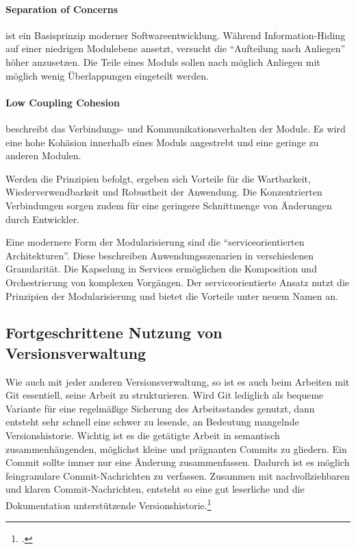 \paragraph{Separation of Concerns} ist ein Basisprinzip moderner Softwareentwicklung. Während Information-Hiding auf einer niedrigen Modulebene ansetzt, versucht die ``Aufteilung nach Anliegen'' höher anzusetzen. Die Teile eines Moduls sollen nach möglich Anliegen  mit möglich wenig Überlappungen eingeteilt werden. 
\paragraph{Low Coupling Cohesion} beschreibt das Verbindungs- und Kommunikationsverhalten der Module. Es wird eine hohe Kohäsion innerhalb eines Moduls angestrebt und eine geringe zu anderen Modulen.

Werden die Prinzipien befolgt, ergeben sich Vorteile für die Wartbarkeit, Wiederverwendbarkeit und Robustheit der Anwendung. Die Konzentrierten Verbindungen sorgen zudem für eine geringere Schnittmenge von Änderungen durch Entwickler.

Eine modernere Form der Modularisierung sind die ``serviceorientierten Architekturen''. Diese beschreiben Anwendungsszenarien in verschiedenen Granularität. Die Kapselung in Services ermöglichen die Komposition und Orchestrierung von komplexen Vorgängen. Der serviceorientierte Ansatz nutzt die Prinzipien der Modularisierung und bietet die Vorteile unter neuem Namen an.

\subsection{Fortgeschrittene Nutzung von Versionsverwaltung}

Wie auch mit jeder anderen Versionsverwaltung, so ist es auch beim Arbeiten mit Git essentiell, seine Arbeit zu strukturieren. Wird Git lediglich als bequeme Variante für eine regelmäßige Sicherung des Arbeitsstandes genutzt, dann entsteht sehr schnell eine schwer zu lesende, an Bedeutung mangelnde Versionshistorie. Wichtig ist es die getätigte Arbeit in semantisch zusammenhängenden, möglichst kleine und prägnanten Commits zu gliedern. Ein Commit sollte immer nur eine Änderung zusammenfassen. Dadurch ist es möglich feingranulare Commit-Nachrichten zu verfassen.
Zusammen mit nachvollziehbaren und klaren Commit-Nachrichten, entsteht so eine gut leserliche und die Dokumentation unterstützende Versionshistorie.\footcite[vgl.][Kap. Making only one change per commit]{git-essentials-2017}

